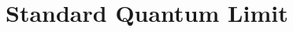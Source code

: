 \documentclass[
]{beamer}
\begin{document}
		







\section{Standard Quantum Limit}
% 
\end{document}
